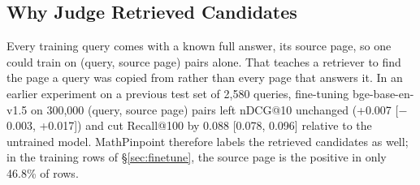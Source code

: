 \subsection{Why Judge Retrieved Candidates}
\label{sec:whycandidates}

Every training query comes with a known full answer, its source page, so one could train on (query, source page) pairs alone. That teaches a retriever to find the page a query was copied from rather than every page that answers it. In an earlier experiment on a previous test set of 2,580 queries, fine-tuning bge-base-en-v1.5 on 300,000 (query, source page) pairs left nDCG@10 unchanged (+0.007 [$-$0.003, +0.017]) and cut Recall@100 by 0.088 [0.078, 0.096] relative to the untrained model. MathPinpoint therefore labels the retrieved candidates as well; in the training rows of \S\ref{sec:finetune}, the source page is the positive in only 46.8\% of rows.
